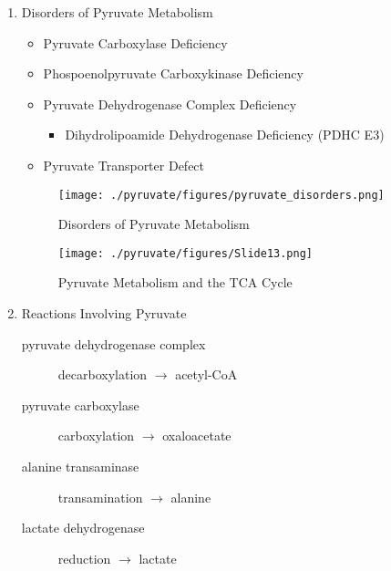 \documentclass{scrartcl}
\begin{document}
\begin{enumerate}
\item Disorders of Pyruvate Metabolism
\label{sec:orga5e1f75}
\begin{itemize}
\item Pyruvate Carboxylase Deficiency
\item Phospoenolpyruvate Carboxykinase Deficiency
\item Pyruvate Dehydrogenase Complex Deficiency
\begin{itemize}
\item Dihydrolipoamide Dehydrogenase Deficiency (PDHC E3)
\end{itemize}
\item Pyruvate Transporter Defect
\end{itemize}

\begin{figure}[htbp]
\centering
\texttt{[image: ./pyruvate/figures/pyruvate\_disorders.png]}
\caption[TCA]{\label{fig:org230b1a3}
Disorders of Pyruvate Metabolism}
\end{figure}


\begin{figure}[htbp]
\centering
\texttt{[image: ./pyruvate/figures/Slide13.png]}
\caption[TCA]{\label{fig:org2d95b8c}
Pyruvate Metabolism and the TCA Cycle}
\end{figure}

\item Reactions Involving Pyruvate
\label{sec:orge7e3804}

\begin{description}
\item[{pyruvate dehydrogenase complex}] decarboxylation \(\to\) acetyl-CoA
\end{description}


\begin{description}
\item[{pyruvate carboxylase}] carboxylation \(\to\) oxaloacetate
\end{description}


\begin{description}
\item[{alanine transaminase}] transamination \(\to\) alanine
\end{description}


\begin{description}
\item[{lactate dehydrogenase}] reduction \(\to\) lactate
\end{description}

\end{enumerate}
\end{document}
